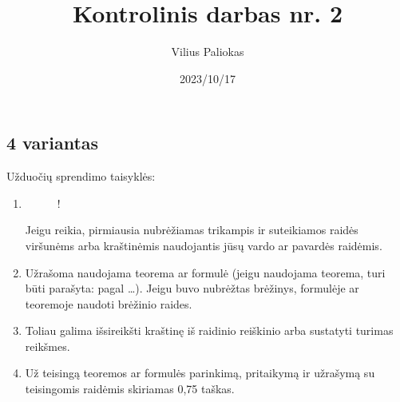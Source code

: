 \documentclass[a4paper]{article}
\title{Kontrolinis darbas nr. 2}
\author{Vilius Paliokas}
\date{2023/10/17}
\newcommand{\germanqq}[1]{{\selectlanguage{german}\glqq#1\grqq\selectlanguage{english}}}
\begin{document}
\thispagestyle{fancy}

\subsection*{4 variantas}

Užduočių sprendimo taisyklės:

\begin{enumerate}[label= (\alph*)]

      \item

            \begin{adjustbox}{minipage={\linewidth}, valign=t}

                  \begin{wrapfigure}{t}{0.17\linewidth}

                        \begin{resizebox}{0.17\textwidth}{!}{
                                    }
                        \end{resizebox}
                        \vspace{-2\baselineskip}

                  \end{wrapfigure}

                  \vspace*{0.15em}

                  Jeigu reikia, pirmiausia nubrėžiamas trikampis ir suteikiamos
                  raidės viršunėms arba kraštinėmis naudojantis jūsų vardo ar
                  pavardės raidėmis.
            \end{adjustbox}

      \item \parbox{0.8\textwidth}{
                  Užrašoma naudojama teorema ar formulė (jeigu
                  naudojama teorema, turi būti parašyta: \germanqq{pagal
                        \ldots }). Jeigu buvo nubrėžtas brėžinys, formulėje ar
                  teoremoje naudoti brėžinio raides.
            }

      \item \parbox{0.7\textwidth}{
                  Toliau galima išsireikšti kraštinę iš
                  raidinio reiškinio arba sustatyti turimas
                  reikšmes.
            }

      \item \parbox{0.7\textwidth}{ Už teisingą teoremos ar formulės parinkimą,
                  pritaikymą ir užrašymą su teisingomis raidėmis skiriamas 0,75
                  taškas.}
\end{enumerate}
\end{document}

